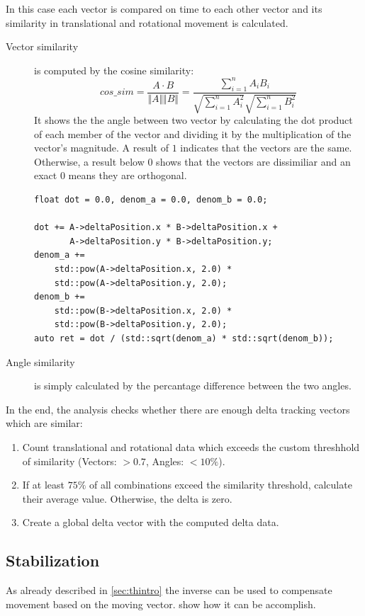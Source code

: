 In this case each vector is compared on time to each other vector and its similarity in translational and rotational movement is calculated.
\begin{description}
    \item[Vector similarity] is computed by the cosine similarity:
    \[cos\_sim = \frac{A \cdot B}{\Vert A\Vert \Vert B\Vert} = \frac{\sum\limits_{i=1}^{n} A_iB_i}{\sqrt{\sum\limits_{i=1}^{n}A_i^2} \sqrt{\sum\limits_{i=1}^{n}B_i^2}}\]
    It shows the the angle between two vector by calculating the dot product of each member of the vector and dividing it by the multiplication of the vector's magnitude. A result of $1$ indicates that the vectors are the same. Otherwise, a result below $0$ shows that the vectors are dissimiliar and an exact $0$ means they are orthogonal.
\begin{lstlisting}[caption={Cosine similarity},label=lst:cossim]
float dot = 0.0, denom_a = 0.0, denom_b = 0.0;

dot += A->deltaPosition.x * B->deltaPosition.x +
       A->deltaPosition.y * B->deltaPosition.y;
denom_a +=
    std::pow(A->deltaPosition.x, 2.0) *
    std::pow(A->deltaPosition.y, 2.0);
denom_b +=
    std::pow(B->deltaPosition.x, 2.0) *
    std::pow(B->deltaPosition.y, 2.0);
auto ret = dot / (std::sqrt(denom_a) * std::sqrt(denom_b));
\end{lstlisting}
    \item[Angle similarity] is simply calculated by the percantage difference between the two angles.\\
\end{description}

In the end, the analysis checks whether there are enough delta tracking vectors which are similar:
\begin{enumerate}
    \item Count translational and rotational data which exceeds the custom threshhold of similarity (Vectors: $>0.7$, Angles: $<10\%$).
    \item If at least $75\%$ of all combinations exceed the similarity threshold, calculate their average value. Otherwise, the delta is zero.
    \item Create a global delta vector with the computed delta data.
\end{enumerate}

\subsection{Stabilization}
As already described in \cref{sec:thintro} the inverse can be used to compensate movement based on the moving vector.  show how it can be accomplish.

